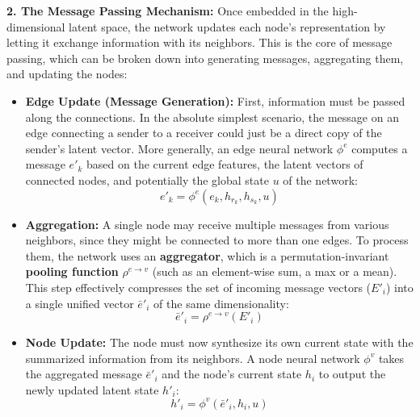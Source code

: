 \textbf{2. The Message Passing Mechanism:}
Once embedded in the high-dimensional latent space, the network updates each node's representation by letting it exchange information with its neighbors. This is the core of message passing, which can be broken down into generating messages, aggregating them, and updating the nodes:

\begin{itemize}
    \item \textbf{Edge Update (Message Generation):} First, information must be passed along the connections. In the absolute simplest scenario, the message on an edge connecting a sender to a receiver could just be a direct copy of the sender's latent vector. More generally, an edge neural network $\phi^e$ computes a message ${e}'_k$ based on the current edge features, the latent vectors of connected nodes, and potentially the global state ${u}$ of the network:
    \begin{equation}
        {e}'_k = \phi^e({e}_k, {h}_{r_k}, {h}_{s_k}, {u})
    \end{equation}
    \item \textbf{Aggregation:} A single node may receive multiple messages from various neighbors, since they might be connected to more than one edges. To process them, the network uses an \textbf{aggregator}, which is a permutation-invariant \textbf{pooling function} $\rho^{e \to v}$ (such as an element-wise sum, a max or a mean). This step effectively compresses the set of incoming message vectors ($E'_i$) into a single unified vector $\bar{{e}}'_i$ of the same dimensionality:
    \begin{equation}
        \bar{{e}}'_i = \rho^{e \to v}(E'_i)
    \end{equation}
    \item \textbf{Node Update:} The node must now synthesize its own current state with the summarized information from its neighbors. A node neural network $\phi^v$ takes the aggregated message $\bar{{e}}'_i$ and the node's current state ${h}_i$ to output the newly updated latent state ${h}'_i$:
    \begin{equation}
        {h}'_i = \phi^v(\bar{{e}}'_i, {h}_i, {u})
    \end{equation}
\end{itemize}
